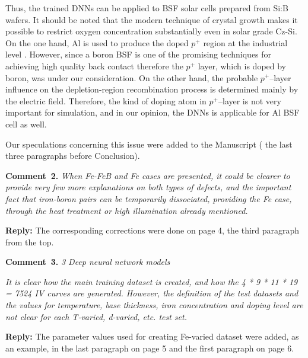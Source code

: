 \documentclass[num-refs]{wiley-article} %
\begin{document}
Thus, the trained DNNs can be applied to BSF solar cells prepared from Si:B wafers.
It should be noted that the modern  technique of crystal growth
makes it possible to restrict
oxygen concentration substantially even in solar grade Cz-Si.
On the one hand,  Al is used to produce the doped $p^+$ region
at the industrial level \cite{GreenRew2019,WilsonRew2020}.
However, since a boron BSF is one of the promising techniques
for achieving high quality back contact \cite{Kim2007,B-BSF}
therefore the $p^{+}$ layer, which is doped by boron, was under our consideration.
On the other hand, the probable $p^+$--layer influence on the depletion-region recombination
process is determined mainly by the electric field.
Therefore, the kind of doping atom in $p^+$--layer is not very important for simulation,
and in our opinion, the  DNNs is applicable for Al BSF cell as well.

Our speculations concerning this issue were added to the Manuscript ( the last three paragraphs before Conclusion).

\vspace{1cm}
\noindent
\textcolor[rgb]{0.00,0.50,1.00}{\textbf{Comment~2.}}
\emph{When Fe-FeB and Fe cases are presented, it could be clearer to provide very few more explanations on both types of defects,
and the important fact that iron-boron pairs can be temporarily dissociated, providing the Fe case,
through the heat treatment or high illumination already mentioned. }

\vspace{0.5cm}
\noindent
\textcolor[rgb]{0.51,0.00,0.00}{\textbf{Reply:}}
The corresponding corrections were done on page 4, the third  paragraph from the top.


\vspace{1cm}
\noindent
\textcolor[rgb]{0.00,0.50,1.00}{\textbf{Comment~3.}}
\emph{3 Deep neural network models}

\emph{
It is clear how the main training dataset is created, and how the 4 * 9 * 11 * 19 = 7524 IV curves are generated.
However, the definition of the test datasets and the values for temperature,
base thickness, iron concentration and doping level are not clear for each T-varied, d-varied, etc. test set. }

\vspace{0.5cm}
\noindent
\textcolor[rgb]{0.51,0.00,0.00}{\textbf{Reply:}}
The parameter values used for creating Fe-varied dataset were added, 
as an example, in the last paragraph on page 5 and the first paragraph on page 6.
\end{document}
